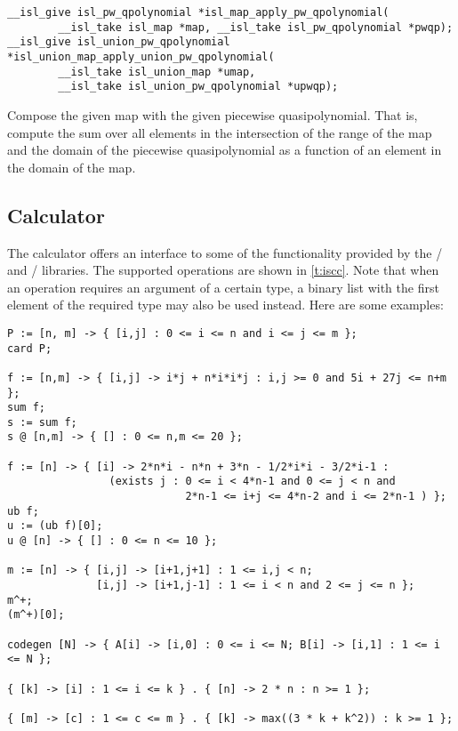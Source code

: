 \begin{verbatim}
__isl_give isl_pw_qpolynomial *isl_map_apply_pw_qpolynomial(
        __isl_take isl_map *map, __isl_take isl_pw_qpolynomial *pwqp);
__isl_give isl_union_pw_qpolynomial *isl_union_map_apply_union_pw_qpolynomial(
        __isl_take isl_union_map *umap,
        __isl_take isl_union_pw_qpolynomial *upwqp);
\end{verbatim}
Compose the given map with the given piecewise quasipolynomial.
That is, compute the sum over all elements in the intersection
of the range of the map and the domain of the piecewise quasipolynomial
as a function of an element in the domain of the map.

\subsection{Calculator}

The  calculator offers an interface to some
of the functionality provided by the \isl/ and \barvinok/
libraries.
The supported operations are shown in \autoref{t:iscc}.
Note that when an operation requires an argument of a certain
type, a binary list with the first element of the required type
may also be used instead.
Here are some examples:
\begin{verbatim}
P := [n, m] -> { [i,j] : 0 <= i <= n and i <= j <= m };
card P;

f := [n,m] -> { [i,j] -> i*j + n*i*i*j : i,j >= 0 and 5i + 27j <= n+m };
sum f;
s := sum f;
s @ [n,m] -> { [] : 0 <= n,m <= 20 };

f := [n] -> { [i] -> 2*n*i - n*n + 3*n - 1/2*i*i - 3/2*i-1 :
                (exists j : 0 <= i < 4*n-1 and 0 <= j < n and
                            2*n-1 <= i+j <= 4*n-2 and i <= 2*n-1 ) };
ub f;
u := (ub f)[0];
u @ [n] -> { [] : 0 <= n <= 10 };

m := [n] -> { [i,j] -> [i+1,j+1] : 1 <= i,j < n;
              [i,j] -> [i+1,j-1] : 1 <= i < n and 2 <= j <= n };
m^+;
(m^+)[0];

codegen [N] -> { A[i] -> [i,0] : 0 <= i <= N; B[i] -> [i,1] : 1 <= i <= N };

{ [k] -> [i] : 1 <= i <= k } . { [n] -> 2 * n : n >= 1 };

{ [m] -> [c] : 1 <= c <= m } . { [k] -> max((3 * k + k^2)) : k >= 1 };
\end{verbatim}

